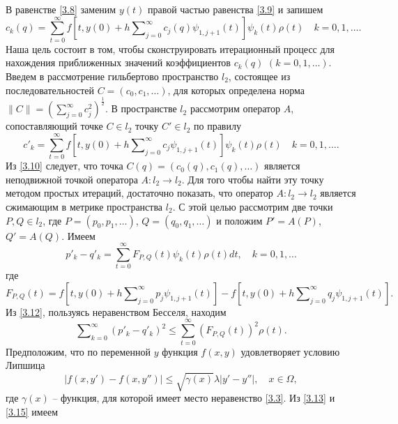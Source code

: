 В равенстве  \eqref{3.8} заменим $y(t)$ правой частью равенства \eqref{3.9} и запишем
\begin{equation}\label{3.10}
c_k(q)=\sum_{t=0}^{\infty} f\left[t,y(0)+h\sum\nolimits_{j=0}^\infty c_j(q)\psi_{1,j+1}(t)\right]\psi_{k}(t)\rho(t)\quad k=0,1,\ldots.
\end{equation}
Наша цель состоит в том, чтобы сконструировать итерационный процесс для нахождения приближенных значений коэффициентов $c_k(q)$ $(k=0,1,\ldots)$.
Введем в рассмотрение гильбертово пространство $l_2$, состоящее из последовательностей $C=(c_0,c_1,\ldots)$, для которых определена норма
$\|C\|=\left(\sum_{j=0}^\infty c_j^2\right)^\frac12$.  В пространстве $l_2$ рассмотрим оператор $A$, сопоставляющий точке $C\in l_2$ точку $C'\in l_2$ по правилу
\begin{equation}\label{3.11}
c'_k=\sum_{t=0}^{\infty} f\left[t,y(0)+h\sum\nolimits_{j=0}^\infty c_j\psi_{1,j+1}(t)\right]\psi_{k}(t)\rho(t)\quad k=0,1,\ldots.
\end{equation}
Из \eqref{3.10} следует, что точка $C(q)=(c_0(q),c_1(q),\ldots)$ является неподвижной точкой оператора $A:l_2\to l_2$. Для того чтобы найти эту точку  методом простых итераций, достаточно показать, что оператор $A:l_2\to l_2$ является сжимающим в метрике пространства $l_2$. С этой целью рассмотрим две точки $P,Q\in l_2$, где $P=(p_0, p_1, \ldots)$, $Q=(q_0, q_1, \ldots)$ и положим $P'=A(P)$, $Q'=A(Q)$. Имеем
\begin{equation}\label{3.12}
p'_k-q'_k=\sum_{t=0}^{\infty}F_{P,Q}(t)\psi_k(t)\rho(t)dt,\quad k=0,1,\ldots
\end{equation}
где
\begin{equation}\label{3.13}
 F_{P,Q}(t)=f\left[t,y(0)+h\sum\nolimits_{j=0}^\infty p_j\psi_{1,j+1}(t)\right]
  -f\left[t,y(0)+h\sum\nolimits_{j=0}^\infty q_j\psi_{1,j+1}(t)\right].
\end{equation}
Из \eqref{3.12}, пользуясь неравенством Бесселя, находим
 \begin{equation}\label{3.14}
\sum\nolimits_{k=0}^\infty (p'_k-q'_k)^2\le\sum_{t=0}^{\infty}(F_{P,Q}(t))^2\rho(t).
\end{equation}
 Предположим, что по переменной $y$ функция $f(x,y)$ удовлетворяет условию Липшица
 \begin{equation}\label{3.15}
|f(x,y')-f(x,y'')|\le \sqrt{\gamma(x)}\lambda|y'-y''|, \quad  x\in\Omega,
\end{equation}
где $\gamma(x)$ -- функция, для которой имеет место неравенство \eqref{3.3}.
Из \eqref{3.13} и \eqref{3.15}  имеем
